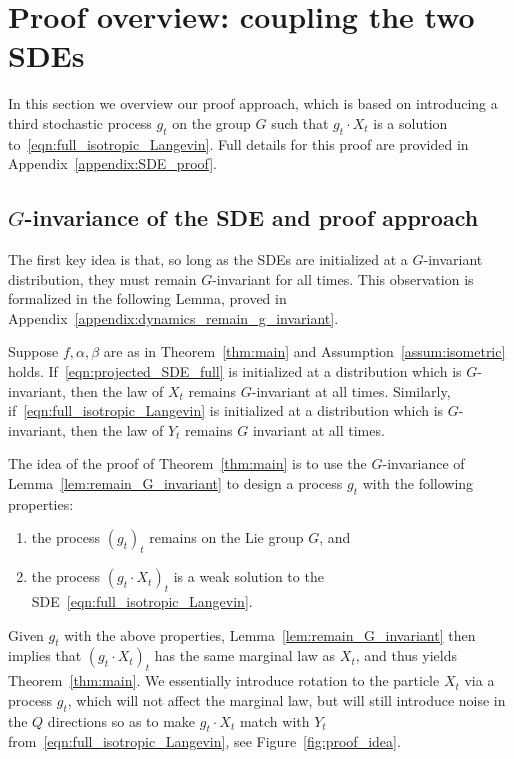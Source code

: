 \documentclass[twoside,a4paper,11pt]{article}
\theoremstyle{plain}
\begin{document}
\section{Proof overview: coupling the two SDEs}
\label{sec:proof_overview}

In this section we overview
our proof approach, which is based on
introducing a third stochastic
process $g_t$ on the group $G$ 
such that $g_t \cdot X_t$ is a solution to~\eqref{eqn:full_isotropic_Langevin}.
Full details for this proof are provided
in Appendix~\ref{appendix:SDE_proof}.











\subsection{$G$-invariance of the SDE and proof approach}
The first key idea is that, so long as the SDEs
are initialized at a $G$-invariant distribution, they
must remain
$G$-invariant for all times. This observation
is formalized in the following Lemma,
proved in Appendix~\ref{appendix:dynamics_remain_g_invariant}.
\begin{lemma}
\label{lem:remain_G_invariant}
Suppose $f, \alpha, \beta$
are as in Theorem~\ref{thm:main}
and Assumption~\ref{assum:isometric} holds.
If~\eqref{eqn:projected_SDE_full}
is initialized at a distribution which is $G$-invariant,
then the law of $X_t$ remains $G$-invariant
at all times.
Similarly, if~\eqref{eqn:full_isotropic_Langevin}
is initialized at a distribution which is $G$-invariant,
then the law of $Y_t$ remains $G$ invariant at all times.
\end{lemma}

The idea of the proof of Theorem~\ref{thm:main} is to use the $G$-invariance
of Lemma~\ref{lem:remain_G_invariant}
to design a process $g_t$ with the following properties:
\begin{enumerate}
    \item[P1.] the process $(g_t)_t$ remains on the Lie group $G$, and
    \item[P2.] the process $(g_t \cdot X_t)_t$ is a weak solution to
    the SDE~\eqref{eqn:full_isotropic_Langevin}.
\end{enumerate}
Given $g_t$ with the above properties, Lemma~\ref{lem:remain_G_invariant}
then implies that $(g_t \cdot X_t)_t$ has the same marginal
law as $X_t$,
and thus yields Theorem~\ref{thm:main}.
We essentially introduce
rotation to the particle $X_t$ via
a process $g_t$, which will not affect
the marginal law, but will still introduce
 noise in the $Q$ directions
 so as to make $g_t \cdot X_t$ match
 with $Y_t$ from~\eqref{eqn:full_isotropic_Langevin},
 see Figure~\ref{fig:proof_idea}.
\end{document}

